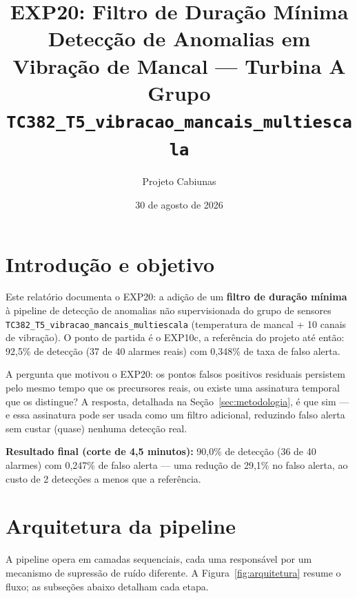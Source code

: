 \documentclass[11pt,a4paper]{article}
\title{\textbf{EXP20: Filtro de Duração Mínima}\\[4pt]
  \large Detecção de Anomalias em Vibração de Mancal --- Turbina A\\
  \large Grupo \texttt{TC382\_T5\_vibracao\_mancais\_multiescala}}
\author{Projeto Cabiunas}
\date{30 de agosto de 2026}
\begin{document}
\maketitle
\thispagestyle{empty}
\tableofcontents
\newpage

\section{Introdução e objetivo}
\label{sec:intro}

Este relatório documenta o EXP20: a adição de um \textbf{filtro de
duração mínima} à pipeline de detecção de anomalias não supervisionada
do grupo de sensores \texttt{TC382\_T5\_vibracao\_mancais\_multiescala}
(temperatura de mancal + 10 canais de vibração). O ponto de partida é o
EXP10c, a referência do projeto até então: 92,5\% de detecção
(37 de 40 alarmes reais) com 0,348\% de taxa de falso alerta.

A pergunta que motivou o EXP20: os pontos falsos positivos residuais
persistem pelo mesmo tempo que os precursores reais, ou existe uma
assinatura temporal que os distingue? A resposta, detalhada na
Seção~\ref{sec:metodologia}, é que sim --- e essa assinatura pode ser
usada como um filtro adicional, reduzindo falso alerta sem custar
(quase) nenhuma detecção real.

\textbf{Resultado final (corte de 4,5 minutos):} 90,0\% de detecção
(36 de 40 alarmes) com 0,247\% de falso alerta --- uma redução de
29,1\% no falso alerta, ao custo de 2 detecções a menos que a
referência.

\section{Arquitetura da pipeline}
\label{sec:pipeline}

A pipeline opera em camadas sequenciais, cada uma responsável por um
mecanismo de supressão de ruído diferente. A Figura~\ref{fig:arquitetura}
resume o fluxo; as subseções abaixo detalham cada etapa.
\end{document}
